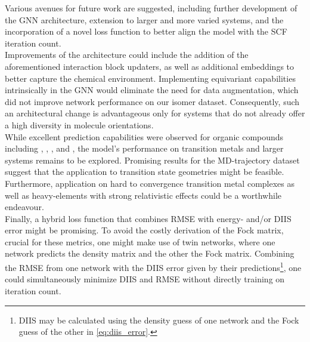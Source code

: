 Various avenues for future work are suggested, including further development of the GNN architecture, extension to larger and more varied systems, and the incorporation of a novel loss function to better align the model with the SCF iteration count. \\
Improvements of the architecture could include the addition of the aforementioned interaction block updaters, as well as additional embeddings to better capture the chemical environment. Implementing equivariant capabilities intrinsically in the GNN would eliminate the need for data augmentation, which did not improve network performance on our isomer dataset. Consequently, such an architectural change is advantageous only for systems that do not already offer a high diversity in molecule orientations.\\
While excellent prediction capabilities were observed for organic compounds including , , ,  and , the model's performance on transition metals and larger systems remains to be explored. Promising results for the MD-trajectory dataset suggest that the application to transition state geometries might be feasible.
Furthermore, application on hard to convergence transition metal complexes as well as heavy-elements with strong relativistic effects could be a worthwhile endeavour. \\
Finally, a hybrid loss function that combines RMSE with energy- and/or DIIS error might be promising. To avoid the costly derivation of the Fock matrix, crucial for these metrics, one might make use of twin networks, where one network predicts the density matrix and the other the Fock matrix. Combining the RMSE from one network with the DIIS error given by their predictions\footnote{DIIS may be calculated using the density guess of one network and the Fock guess of the other in \autoref{eq:diis_error}.}, one could simultaneously minimize DIIS and RMSE without directly training on iteration count.

